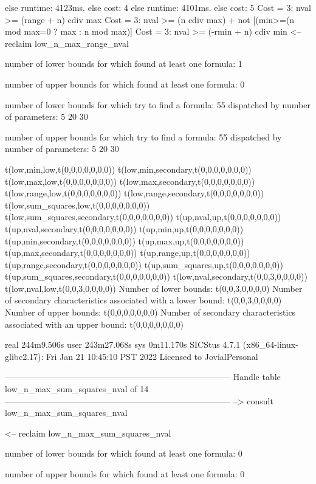 else runtime: 4123ms. else cost: 4
else runtime: 4101ms. else cost: 5
Cost =  3:  nval >= (range + n) cdiv max
Cost =  3:  nval >= (n cdiv max) + not [(min>=(n mod max=0 ? max : n mod max)] %
Cost =  3:  nval >= (-rmin + n) cdiv min
<-- reclaim low_n_max_range_nval

number of lower bounds for which found at least one formula: 1

number of upper bounds for which found at least one formula: 0

number of lower bounds for which try to find a formula: 55
dispatched by number of parameters: 5  20  30

number of upper bounds for which try to find a formula: 55
dispatched by number of parameters: 5  20  30

t(low,min,low,t(0,0,0,0,0,0,0))
t(low,min,secondary,t(0,0,0,0,0,0,0))
t(low,max,low,t(0,0,0,0,0,0,0))
t(low,max,secondary,t(0,0,0,0,0,0,0))
t(low,range,low,t(0,0,0,0,0,0,0))
t(low,range,secondary,t(0,0,0,0,0,0,0))
t(low,sum_squares,low,t(0,0,0,0,0,0,0))
t(low,sum_squares,secondary,t(0,0,0,0,0,0,0))
t(up,nval,up,t(0,0,0,0,0,0,0))
t(up,nval,secondary,t(0,0,0,0,0,0,0))
t(up,min,up,t(0,0,0,0,0,0,0))
t(up,min,secondary,t(0,0,0,0,0,0,0))
t(up,max,up,t(0,0,0,0,0,0,0))
t(up,max,secondary,t(0,0,0,0,0,0,0))
t(up,range,up,t(0,0,0,0,0,0,0))
t(up,range,secondary,t(0,0,0,0,0,0,0))
t(up,sum_squares,up,t(0,0,0,0,0,0,0))
t(up,sum_squares,secondary,t(0,0,0,0,0,0,0))
t(low,nval,secondary,t(0,0,3,0,0,0,0))
t(low,nval,low,t(0,0,3,0,0,0,0))
Number of lower bounds:                                             t(0,0,3,0,0,0,0)
Number of secondary characteristics associated with a lower bound:  t(0,0,3,0,0,0,0)
Number of upper bounds:                                             t(0,0,0,0,0,0,0)
Number of secondary characteristics associated with an upper bound: t(0,0,0,0,0,0,0)

real	244m9.506s
user	243m27.068s
sys	0m11.170s
SICStus 4.7.1 (x86_64-linux-glibc2.17): Fri Jan 21 10:45:10 PST 2022
Licensed to JovialPersonal


--------------------------------------------------------------------------------
Handle table low_n_max_sum_squares_nval of 14
--------------------------------------------------------------------------------
--> consult low_n_max_sum_squares_nval

<-- reclaim low_n_max_sum_squares_nval

number of lower bounds for which found at least one formula: 0

number of upper bounds for which found at least one formula: 0

